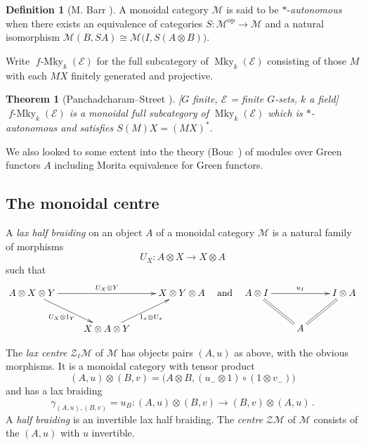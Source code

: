 \documentclass[a4paper,12pt]{article}
\newtheorem*{Theorem}{Theorem}%
\theoremstyle{definition}
\newtheorem*{Definition}{Definition}%
\theoremstyle{fact}
\theoremstyle{genquest}
\theoremstyle{step}
\newcommand{\catE}{\mathcal{E}}
\newcommand{\funcM}{\mathcal{M}}
\newcommand{\Mky}{\operatorname{Mky}}
\newcommand{\fMky}{\operatorname{\mathit{f}-Mky}}
\newcommand{\catZ}{\mathcal{Z}}%
\newcommand{\op}{\operatorname{op}}
\newcommand{\longto}{\longrightarrow}
\begin{document}
\begin{Definition}[M. Barr \cite{Barr1979}]
A monoidal category $\funcM$ is said to be $\ast$-\emph{autonomous} when there exists an equivalence of categories
 $S : \funcM^{\op} \longto \funcM$
 and a natural isomorphism $\funcM (B,SA) \cong \funcM \bigl(I,S(A\otimes B)\bigr)$.
\end{Definition}

\noindent 
Write $\fMky_k(\catE)$ for the full subcategory  of $\Mky_k(\catE)$ consisting of those $M$ 
with each $MX$ finitely generated and projective.
 
\begin{Theorem}[Panchadcharam--Street \cite{MFCCC}] {\upshape[}$G$ finite, $\catE$ = finite $G$-sets, $k$ a field\/{\upshape]}\\
$\fMky_k(\catE)$ is a monoidal full subcategory of $\Mky_k(\catE)$ which is $\ast$-autonomous 
and satisfies $S(M)X = (MX)^\ast$.
\end{Theorem}

\noindent
We also looked to some extent into the theory (Bouc~\cite{BoucBook}) of modules over Green functors $A$ 
including Morita equivalence for Green functors. 


 \subsection{The monoidal centre\label{Lecture3sub3}}

A \emph{lax half braiding} on an object $A$ of a monoidal category $\funcM$ is a natural family of morphisms
\[
U_X : A \otimes X \longto X \otimes A
\]
such that
\[
\xymatrix{
 A \otimes X \otimes Y \ar[rr]^{U_X \otimes Y} \ar[rd]_{U_X \otimes 1_Y} 
& & X \otimes Y \otimes A \\
& X \otimes A \otimes Y \ar[ru]_{1_x \otimes U_x}}  
 \quad \mbox{and} \quad   
 \xymatrix{A \otimes I \ar[rr]^{u_I} \ar@{=}[rd] & & I \otimes A \ar@{=}[ld] \\
 & A }
\]

The \emph{lax centre} $\catZ_\ell \funcM$ of $\funcM$ has objects pairs $(A,u)$ as above, with the obvious morphisms.   It is a monoidal category with tensor product
 \[
 (A,u) \otimes (B,v) = \bigl(A \otimes B, (u_- \otimes 1) \circ (1 \otimes v_-)\bigr)
 \]
and has a lax braiding
\[
\gamma^{}_{(A,u),(B,v)} = u_B : (A,u) \otimes (B,v) \to (B,v) \otimes (A,u)\,.
\]
A \emph{half braiding} is an invertible lax half braiding.  
The \emph{centre} $\catZ\funcM$ of $\funcM$ consists of the $(A,u)$ with $u$ invertible.
\end{document}
